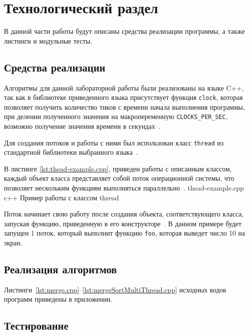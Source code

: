\chapter{Технологический раздел}

В данной части работы будут описаны средства реализации программы, а также листинги и  модульные  тесты.
	
\section{Средства реализации}
Алгоритмы для данной лабораторной работы были реализованы на языке C++, так как в библиотеке приведенного языка присутствует функция \texttt{clock}, которая  позволяет получить количество тиков с времени начала выполнения программы, при делении полученного значения на макропеременную \texttt{CLOCKS\_PER\_SEC}, возможно получение значения времени в секундах~\cite{cpp-time}.

Для создания потоков и работы с ними был использован класс \texttt{thread} из стандартной библиотеки выбранного языка~\cite{std-thread}.

В листинге \ref{lst:thead-example.cpp}, приведен работы с описанным классом, каждый объект класса представляет собой поток операционной системы, что позволяет нескольким функциям выполняться параллельно~\cite{std-thread}. 
{thead-example.cpp} %
{c++} %
{Пример работы с классом thread} %

Поток начинает свою работу после создания объекта, соответствующего класса, запуская функцию, приведенную в его конструкторе~\cite{std-thread}.
В данном примере будет запущен 1 поток, который выполнит функцию \texttt{foo},
которая выведет число 10 на экран.

\section{Реализация алгоритмов}
Листинги~\ref{lst:merge.cpp}--\ref{lst:mergeSortMultiThread.cpp} исходных кодов программ приведены в приложении. 

\section{Тестирование}

